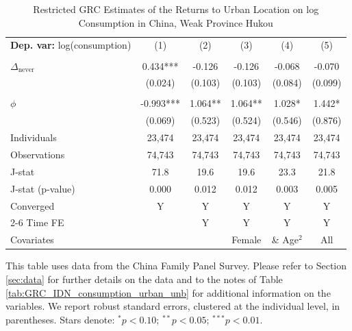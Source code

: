 \begin{table}[htbp] \centering \begin{threeparttable}
 \caption{Restricted GRC Estimates of the Returns to Urban Location on log Consumption in China, Weak Province Hukou} 
 \label{tab:GRC_CHN_weak_consumption_urban_unb} 
\begin{tabular}{l ccccc} \toprule  \textbf{Dep. var:}  log(consumption) 
                    &\multicolumn{1}{c}{(1)}   &\multicolumn{1}{c}{(2)}   &\multicolumn{1}{c}{(3)}   &\multicolumn{1}{c}{(4)}   &\multicolumn{1}{c}{(5)}   \\
                    &               &               &               &               &               \\
\addlinespace
$\Delta_{\text{never}}$&       0.434***&      -0.126   &      -0.126   &      -0.068   &      -0.070   \\
                    &     (0.024)   &     (0.103)   &     (0.103)   &     (0.084)   &     (0.099)   \\
                    &               &               &               &               &               \\
\addlinespace
$\phi$              &      -0.993***&       1.064** &       1.064** &       1.028*  &       1.442*  \\
                    &     (0.069)   &     (0.523)   &     (0.524)   &     (0.546)   &     (0.876)   \\
\addlinespace
Individuals         &      23,474   &      23,474   &      23,474   &      23,474   &      23,474   \\
Observations        &      74,743   &      74,743   &      74,743   &      74,743   &      74,743   \\
J-stat              &        71.8   &        19.6   &        19.6   &        23.3   &        21.8   \\
J-stat (p-value)    &       0.000   &       0.012   &       0.012   &       0.003   &       0.005   \\
Converged           &           Y   &           Y   &           Y   &           Y   &           Y   \\
\cmidrule{2-6} Time FE & & Y & Y & Y & Y \\ Covariates & & & Female & \& Age$^2$ & All \\ \bottomrule \end{tabular} \begin{tablenotes}[flushleft] \footnotesize \item{This table uses data from the China Family Panel Survey. Please refer to Section \ref{sec:data} for further details on the data and to the notes of Table \ref{tab:GRC_IDN_consumption_urban_unb} for additional information on the variables. We report robust standard errors, clustered at the individual level, in parentheses. Stars denote: $^{*} p<0.10$; $^{**} p<0.05$; $^{***} p<0.01$.} \end{tablenotes} \end{threeparttable} \end{table}
